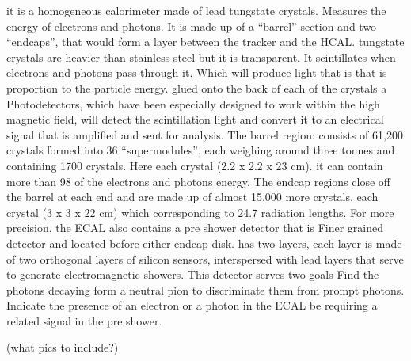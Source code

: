 it is a homogeneous calorimeter made of lead tungstate crystals. Measures the energy of electrons and photons. It is made up of a “barrel” section and two “endcaps”, that would form a layer between the tracker and the HCAL. 
tungstate crystals are heavier than stainless steel but it is transparent. It scintillates when electrons and photons pass through it. Which will produce light that is that is proportion to the particle energy.
glued onto the back of each of the crystals a Photodetectors, which have been especially designed to work within the high magnetic field, will detect the scintillation light and convert it to an electrical signal that is amplified and sent for analysis. 
The barrel region: consists of 61,200 crystals formed into 36 “supermodules”, each weighing around three tonnes and containing 1700 crystals. Here each crystal (2.2 x 2.2 x 23 cm). it can contain more than 98 of the electrons and photons energy.  
The endcap regions close off the barrel at each end and are made up of almost 15,000 more crystals. each crystal (3 x 3 x 22 cm) which corresponding to 24.7 radiation lengths.   
For more precision, the ECAL also contains a pre shower detector that is Finer grained detector and located before either endcap disk.  has two layers, each layer is made of two orthogonal layers of silicon sensors, interspersed with lead layers that serve to generate electromagnetic showers. This detector serves two goals Find the photons decaying form a neutral pion to discriminate them from prompt photons.  Indicate the presence of an electron or a photon in the ECAL be requiring a related signal in the pre shower. 

(what pics to include?)  

